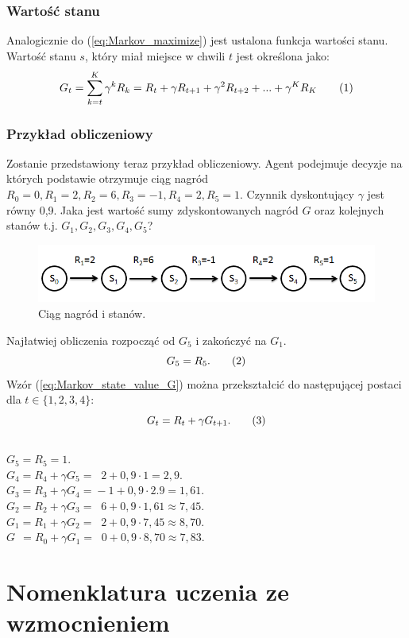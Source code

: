 \documentclass[12pt]{book}
\theoremstyle{plain}
\newcommand\addtag{\refstepcounter{equation}
\renewcommand{\labelenumii}{\theenumii}
\renewcommand{\theenumii}{\theenumi.\arabic{enumii}.}
\tag{\theequation}}
\newcommand{\myref}[1]{(\ref{#1})}
\begin{document}
\subsubsection*{Wartość stanu}
Analogicznie do (\ref{eq:Markov_maximize}) jest ustalona funkcja wartości stanu. Wartość stanu $s$, który miał miejsce w chwili $t$ jest określona jako:
\[
G_t=\sum_{k=t}^{K} \gamma^k R_{k}=R_{t}+\gamma R_{t+1}+\gamma^{2} R_{t+2}+...+\gamma^{K}R_K \addtag \label{eq:Markov_state_value_G}
\]
\subsubsection*{Przykład obliczeniowy}
Zostanie przedstawiony teraz przykład obliczeniowy. Agent podejmuje decyzje na których podstawie otrzymuje ciąg  nagród $R_0=0, R_1=2,R_2=6,R_3=-1,R_4=2,R_5=1$. Czynnik dyskontujący $\gamma$ jest równy 0,9. Jaka jest wartość sumy zdyskontowanych nagród $G$ oraz kolejnych stanów t.j. $G_1,G_2,G_3,G_4,G_5$?\\
\begin{figure}[H]
	\centering
	\includegraphics[width=14cm]{rewards-graph}
	\caption{Ciąg nagród i stanów.}
	\label{fig:agent-srodowisko}
\end{figure}\noindent
Najłatwiej obliczenia rozpocząć od $G_5$ i zakończyć na $G_1$.
\[G_5=R_5.  \addtag\]
Wzór \myref{eq:Markov_state_value_G} można przekształcić do następującej postaci dla $t \in \{1,2,3,4\}$:
\[G_{t}=R_{t}+\gamma G_{t+1} \label{eq:G_reccurential}. \addtag \]\\
$G_5=R_5=1.$\\
$G_4=R_4+\gamma G_{5}=\;\;2+0,9\cdot 1=2,9.$\\
$G_3=R_3+\gamma G_{4}=\!-1+0,9\cdot2.9=1,61.$\\
$G_2=R_2+\gamma G_{3}=\;\;6+0,9\cdot1,61 \approx 7,45.$\\
$G_1=R_1+\gamma G_{2}=\;\;2+0,9\cdot 7,45 \approx 8,70.$\\
$G\;\,=R_0+\gamma G_{1}=\;\;0+0,9\cdot 8,70 \approx 7,83.$\\

\section{Nomenklatura uczenia ze wzmocnieniem}
\end{document}
